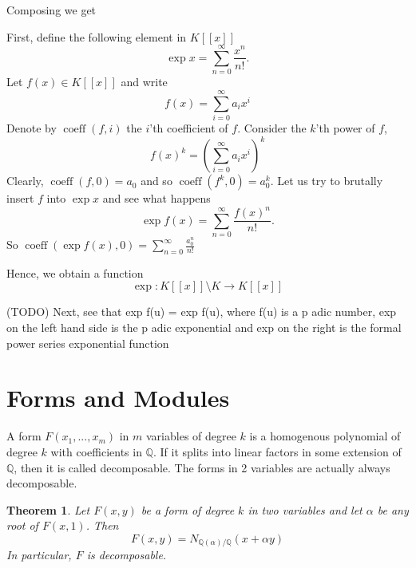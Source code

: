\documentclass{article}
\DeclareMathOperator{\coeff}{coeff}
\newtheorem{theorem}{Theorem}[section]
\newcommand{\mbb}[1]{\mathbb{#1}}
\begin{document}
Composing we get 




First, define the following element in $K[[x]]$
$$\exp x = \sum_{n = 0}^\infty \frac{x^n}{n!}.$$
Let $f(x) \in K[[x]]$ and write 
$$f(x) = \sum_{i = 0}^\infty a_i x^i$$
Denote by $\coeff(f, i)$ the $i$'th coefficient of $f$. Consider the $k$'th power of $f$,
$$f(x)^k = (\sum_{i = 0}^\infty a_i x^i)^k$$ 
Clearly, $\coeff (f, 0) = a_0$ and so $\coeff(f^k, 0) = a_0^k$. Let us try to brutally insert $f$ into $\exp x$ and see what happens
$$\exp f(x) = \sum_{n = 0}^\infty \frac{f(x)^n}{n!}.$$
So $\coeff(\exp f(x), 0) = \sum_{n = 0}^\infty \frac{a_0^n}{n!}$ 



Hence, we obtain a function
$$\exp : K[[x]] \setminus K \to K[[x]]$$



(TODO)
Next, see that exp f(u) = exp f(u), where f(u) is a p adic number, exp on the left hand side is the p adic exponential and exp on the right is the formal power series exponential function 









\section{Forms and Modules}
A form $F(x_1, ..., x_m)$ in $m$ variables of degree $k$ is a homogenous polynomial of degree $k$ with coefficients in $\mbb{Q}$. If it splits into linear factors in some extension of $\mbb{Q}$, then it is called decomposable. The forms in 2 variables are actually always decomposable. 

\begin{theorem}\label{thm: Forms in two variables are decomposable}
    Let $F(x, y)$ be a form of degree $k$ in two variables and let $\alpha$ be any root of $F(x, 1)$. Then 
    $$F(x, y) = N_{\mbb Q (\alpha) / \mbb Q}(x + \alpha y)$$ 
    In particular, $F$ is decomposable.
\end{theorem}
\end{document}
